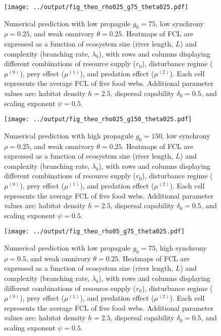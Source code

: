 \begin{figure}
\centering
\texttt{[image: ../output/fig\_theo\_rho025\_g75\_theta025.pdf]}
\caption{\label{fig:fig-num1}Numerical prediction with low propagule
\(g_0 = 75\), low synchrony \(\rho = 0.25\), and weak omnivory
\(\theta = 0.25\). Heatmaps of FCL are expressed as a function of
ecosystem size (river length, \(L\)) and complexity (branching rate,
\(\lambda_b\)), with rows and columns displaying different combinations
of resource supply (\(r_0\)), disturbance regime (\(\mu^{(0)}\)), prey
effect (\(\mu^{(1)}\)), and predation effect (\(\mu^{(2)}\)). Each cell
represents the average FCL of five food webs. Additional parameter
values are: habitat density \(h=2.5\), dispersal capability
\(\delta_0=0.5\), and scaling exponent \(\psi=0.5\).}
\end{figure}

\newpage

\begin{figure}
\centering
\texttt{[image: ../output/fig\_theo\_rho025\_g150\_theta025.pdf]}
\caption{\label{fig:fig-num2}Numerical prediction with high propagule
\(g_0 = 150\), low synchrony \(\rho = 0.25\), and weak omnivory
\(\theta = 0.25\). Heatmaps of FCL are expressed as a function of
ecosystem size (river length, \(L\)) and complexity (branching rate,
\(\lambda_b\)), with rows and columns displaying different combinations
of resource supply (\(r_0\)), disturbance regime (\(\mu^{(0)}\)), prey
effect (\(\mu^{(1)}\)), and predation effect (\(\mu^{(2)}\)). Each cell
represents the average FCL of five food webs. Additional parameter
values are: habitat density \(h=2.5\), dispersal capability
\(\delta_0=0.5\), and scaling exponent \(\psi=0.5\).}
\end{figure}

\newpage

\begin{figure}
\centering
\texttt{[image: ../output/fig\_theo\_rho05\_g75\_theta025.pdf]}
\caption{\label{fig:fig-num3}Numerical prediction with low propagule
\(g_0 = 75\), high synchrony \(\rho = 0.5\), and weak omnivory
\(\theta = 0.25\). Heatmaps of FCL are expressed as a function of
ecosystem size (river length, \(L\)) and complexity (branching rate,
\(\lambda_b\)), with rows and columns displaying different combinations
of resource supply (\(r_0\)), disturbance regime (\(\mu^{(0)}\)), prey
effect (\(\mu^{(1)}\)), and predation effect (\(\mu^{(2)}\)). Each cell
represents the average FCL of five food webs. Additional parameter
values are: habitat density \(h=2.5\), dispersal capability
\(\delta_0=0.5\), and scaling exponent \(\psi=0.5\).}
\end{figure}

